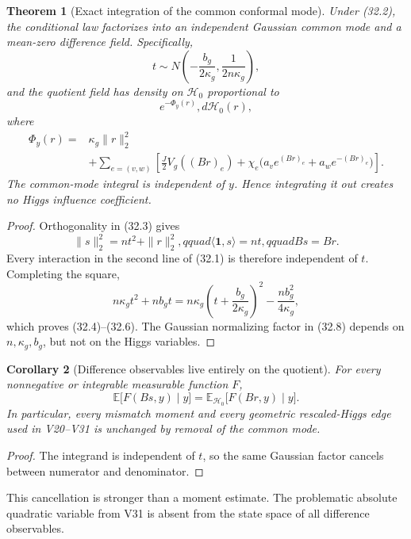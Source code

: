 \documentclass[11pt]{article}
\newtheorem{theorem}{Theorem}[section]
\newtheorem{corollary}[theorem]{Corollary}
\theoremstyle{remark}
\begin{document}
\begin{theorem}[Exact integration of the common conformal mode]
\label{thm:v17v32-factor}
Under (32.2), the conditional law factorizes into an independent
Gaussian common mode and a mean-zero difference field.  Specifically,
\[
 t\sim N\left(-\frac{b_g}{2\kappa_g},
 \frac{1}{2n\kappa_g}\right),                     \tag{32.4}
\]
and the quotient field has density on \(\mathcal H_0\) proportional to
\[
 e^{-\Phi_y(r)},d\mathcal H_0(r),                 \tag{32.5}
\]
where
\[
\begin{aligned}
 \Phi_y(r)={}&\kappa_g\|r\|_2^2\\
 &+\sum_{e=(v,w)}\left[
 \frac J2V_g((Br)_e)
 +\chi_e\bigl(a_ve^{(Br)_e}+a_we^{-(Br)_e}\bigr)
 \right].                                         \tag{32.6}
\end{aligned}
\]
The common-mode integral is independent of \(y\).  Hence integrating
it out creates no Higgs influence coefficient.
\end{theorem}

\begin{proof}
Orthogonality in (32.3) gives
\[
 \|s\|_2^2=nt^2+\|r\|_2^2,qquad
 \langle\mathbf1,s\rangle=nt,qquad Bs=Br.        \tag{32.7}
\]
Every interaction in the second line of (32.1) is therefore independent
of \(t\).  Completing the square,
\[
 n\kappa_gt^2+nb_gt
 =n\kappa_g\left(t+\frac{b_g}{2\kappa_g}\right)^2
 -\frac{nb_g^2}{4\kappa_g},                       \tag{32.8}
\]
which proves (32.4)--(32.6).  The Gaussian normalizing factor in
(32.8) depends on \(n,\kappa_g,b_g\), but not on the Higgs variables.
\end{proof}

\begin{corollary}[Difference observables live entirely on the quotient]
\label{cor:v17v32-difference}
For every nonnegative or integrable measurable function \(F\),
\[
 \mathbb E\bigl[F(Bs,y)\mid y\bigr]
 =\mathbb E_{\mathcal H_0}
 \bigl[F(Br,y)\mid y\bigr].                       \tag{32.9}
\]
In particular, every mismatch moment and every geometric rescaled-Higgs
edge used in V20--V31 is unchanged by removal of the common mode.
\end{corollary}

\begin{proof}
The integrand is independent of \(t\), so the same Gaussian factor
cancels between numerator and denominator.
\end{proof}

This cancellation is stronger than a moment estimate.  The problematic
absolute quadratic variable from V31 is absent from the state space of
all difference observables.
\end{document}
